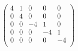 \documentclass[12pt]{exam}
\begin{document}
\begin{enumerate}
\begin{enumerate}
    $$
    \begin{pmatrix}
        4 & 1 & 0 & 0 & 0 \\
0 & 4 & 0 & 0 & 0 \\
0 & 0 & -4 & 1 & 0 \\
0 & 0 & 0 & -4 & 1 \\
0 & 0 & 0 & 0 & -4 \\
    \end{pmatrix}
    $$
\end{enumerate}
\end{enumerate}
\end{document}
